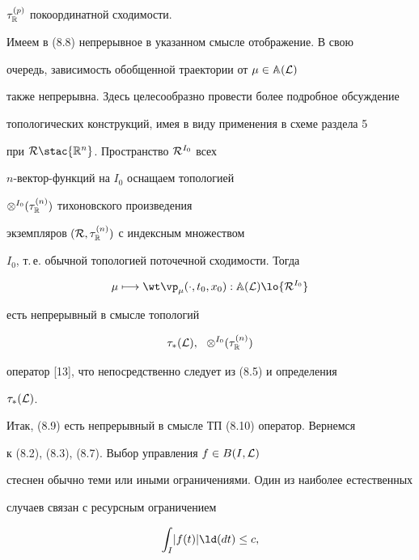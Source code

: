 ${{\tau}_{\Bbb R}^{(p)}}$ покоординатной сходимости.


Имеем в (8.8) непрерывное в указанном смысле отображение. В свою


очередь, зависимость обобщенной траектории от $\mu \in {{\Bbb A}({\cal L})}$


также непрерывна. Здесь целесообразно провести более подробное обсуждение


топологических конструкций, имея в виду применения в схеме раздела 5


при ${\cal R} \stac {{\Bbb R}^n}$. Пространство ${\cal R}^{I_0}$ всех


$n$-вектор-функций на $I_0$ оснащаем топологией


${{\otimes}^{I_0}}({\tau}_{\Bbb R}^{(n)})$ тихоновского произведения


экземпляров $({\cal R},{{\tau}_{\Bbb R}^{(n)}})$ с индексным множеством


${I_0}$, т.\,е. обычной топологией поточечной сходимости. Тогда


\begin{equation}


\mu \longmapsto {{\wt \vp}_\mu}(\cdot,{t_0},{x_0}):


{{\Bbb A}({\cal L})} \lo {{\cal R}^{I_0}}


\end{equation}


есть непрерывный в смысле топологий


\begin{equation}


{{\tau}_*}({\cal L}),\ \ {{\otimes}^{I_0}}({\tau}_{\Bbb R}^{(n)})


\end{equation}


оператор [13], что непосредственно следует из (8.5) и определения


${{\tau}_*}({\cal L})$.


Итак, (8.9) есть непрерывный в смысле ТП (8.10) оператор. Вернемся


к (8.2), (8.3), (8.7). Выбор управления $f \in B(I,{\cal L})$


стеснен обычно теми или иными ограничениями. Один из наиболее естественных


случаев связан с ресурсным ограничением


\begin{equation}


{\int_I}|{f(t)}|{{\ld}(dt)} \le c,


\end{equation}


